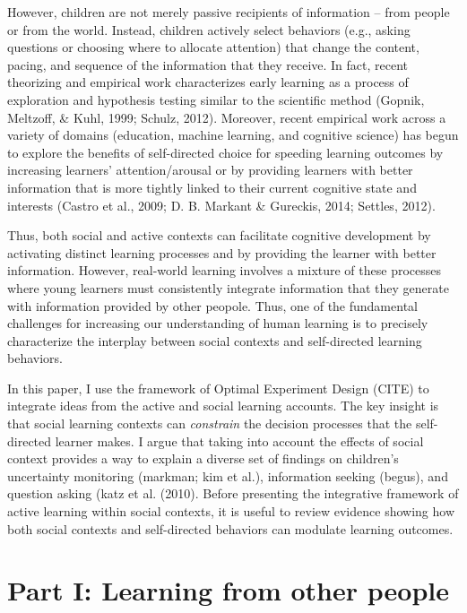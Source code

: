 \documentclass[a4paper,man,apacite,floatsintext]{apa6}
\begin{document}
However, children are not merely passive recipients of information --
from people or from the world. Instead, children actively select
behaviors (e.g., asking questions or choosing where to allocate
attention) that change the content, pacing, and sequence of the
information that they receive. In fact, recent theorizing and empirical
work characterizes early learning as a process of exploration and
hypothesis testing similar to the scientific method (Gopnik, Meltzoff,
\& Kuhl, 1999; Schulz, 2012). Moreover, recent empirical work across a
variety of domains (education, machine learning, and cognitive science)
has begun to explore the benefits of self-directed choice for speeding
learning outcomes by increasing learners' attention/arousal or by
providing learners with better information that is more tightly linked
to their current cognitive state and interests (Castro et al., 2009; D.
B. Markant \& Gureckis, 2014; Settles, 2012).

Thus, both social and active contexts can facilitate cognitive
development by activating distinct learning processes and by providing
the learner with better information. However, real-world learning
involves a mixture of these processes where young learners must
consistently integrate information that they generate with information
provided by other peopole. Thus, one of the fundamental challenges for
increasing our understanding of human learning is to precisely
characterize the interplay between social contexts and self-directed
learning behaviors.

In this paper, I use the framework of Optimal Experiment Design (CITE)
to integrate ideas from the active and social learning accounts. The key
insight is that social learning contexts can \emph{constrain} the
decision processes that the self-directed learner makes. I argue that
taking into account the effects of social context provides a way to
explain a diverse set of findings on children's uncertainty monitoring
(markman; kim et al.), information seeking (begus), and question asking
(katz et al. (2010). Before presenting the integrative framework of
active learning within social contexts, it is useful to review evidence
showing how both social contexts and self-directed behaviors can
modulate learning outcomes.

\section{Part I: Learning from other
people}\label{part-i-learning-from-other-people}
\end{document}
